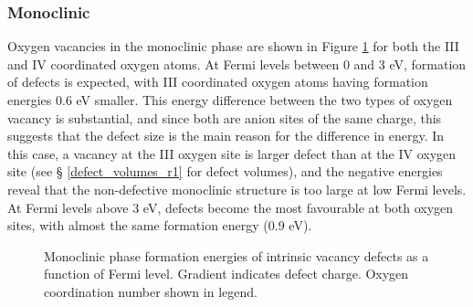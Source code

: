 \subsubsection{Monoclinic}

Oxygen vacancies in the monoclinic phase are shown in Figure \ref{figure:monovacancies} for both the III and IV coordinated oxygen atoms. At Fermi levels between 0 and 3 eV, formation of  defects is expected, with III coordinated oxygen atoms having formation energies 0.6 eV smaller. This energy difference between the two types of oxygen vacancy is substantial, and since both are anion sites of the same charge, this suggests that the defect size is the main reason for the difference in energy. In this case, a vacancy at the III oxygen site is larger defect than at the IV oxygen site (see § \ref{defect_volumes_r1} for defect volumes), and the negative energies reveal that the non-defective monoclinic structure is too large at low Fermi levels. At Fermi levels above 3 eV,  defects become the most favourable at both oxygen sites, with almost the same formation energy (0.9 eV). 

\begin{figure}[ht] %
\begin{center}
		\caption{Monoclinic phase formation energies of intrinsic vacancy defects as a function of Fermi level. Gradient indicates defect charge. Oxygen coordination number shown in legend.}
		\label{figure:monovacancies}
	\end{center}
\end{figure}

